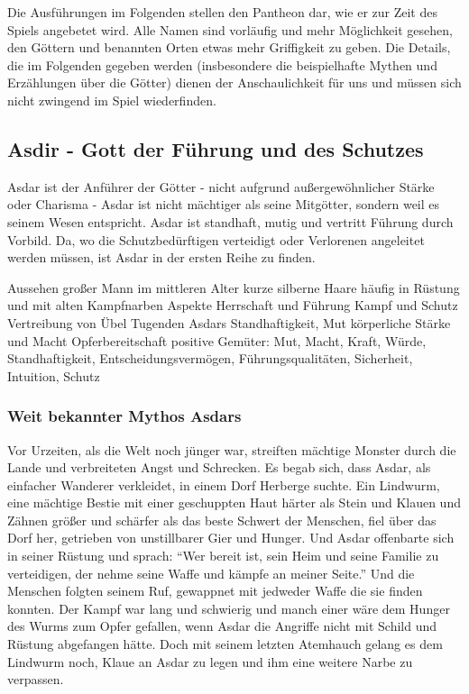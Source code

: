 Die Ausführungen im Folgenden stellen den Pantheon dar, wie er zur Zeit des Spiels angebetet wird.
Alle Namen sind vorläufig und mehr Möglichkeit gesehen, den Göttern und benannten Orten etwas mehr Griffigkeit zu geben.
Die Details, die im Folgenden gegeben werden (insbesondere die beispielhafte Mythen und Erzählungen über die Götter) dienen der Anschaulichkeit für uns und müssen sich nicht zwingend im Spiel wiederfinden.

\subsection{Asdir - Gott der Führung und des Schutzes}
Asdar ist der Anführer der Götter - nicht aufgrund außergewöhnlicher Stärke oder Charisma - Asdar ist nicht mächtiger als seine Mitgötter, sondern weil es seinem Wesen entspricht. 
Asdar ist standhaft, mutig und vertritt Führung durch Vorbild. 
Da, wo die Schutzbedürftigen verteidigt oder Verlorenen angeleitet werden müssen, ist Asdar in der ersten Reihe zu finden.
\begin{outline}
	\1 Aussehen 
		\2 großer Mann im mittleren Alter
		\2 kurze silberne Haare
		\2 häufig in Rüstung und mit alten Kampfnarben
	\1 Aspekte
		\2 Herrschaft und Führung
		\2 Kampf und Schutz
		\2 Vertreibung von Übel
	\1 Tugenden Asdars
		\2 Standhaftigkeit, Mut
		\2 körperliche Stärke und Macht
		\2 Opferbereitschaft
	\1 positive Gemüter: Mut, Macht, Kraft, Würde, Standhaftigkeit, Entscheidungsvermögen, Führungsqualitäten, Sicherheit, Intuition, Schutz
\end{outline}

\subsubsection{Weit bekannter Mythos Asdars}
Vor Urzeiten, als die Welt noch jünger war, streiften mächtige Monster durch die Lande und verbreiteten Angst und Schrecken. 
Es begab sich, dass Asdar, als einfacher Wanderer verkleidet, in einem Dorf Herberge suchte. 
Ein Lindwurm, eine mächtige Bestie mit einer geschuppten Haut härter als Stein und Klauen und Zähnen größer und schärfer als das beste Schwert der Menschen, fiel über das Dorf her, getrieben von unstillbarer Gier und Hunger. 
Und Asdar offenbarte sich in seiner Rüstung und sprach: 
``Wer bereit ist, sein Heim und seine Familie zu verteidigen, der nehme seine Waffe und kämpfe an meiner Seite.'' 
Und die Menschen folgten seinem Ruf, gewappnet mit jedweder Waffe die sie finden konnten. 
Der Kampf war lang und schwierig und manch einer wäre dem Hunger des Wurms zum Opfer gefallen, wenn Asdar die Angriffe nicht mit Schild und Rüstung abgefangen hätte. 
Doch mit seinem letzten Atemhauch gelang es dem Lindwurm noch, Klaue an Asdar zu legen und ihm eine weitere Narbe zu verpassen.




